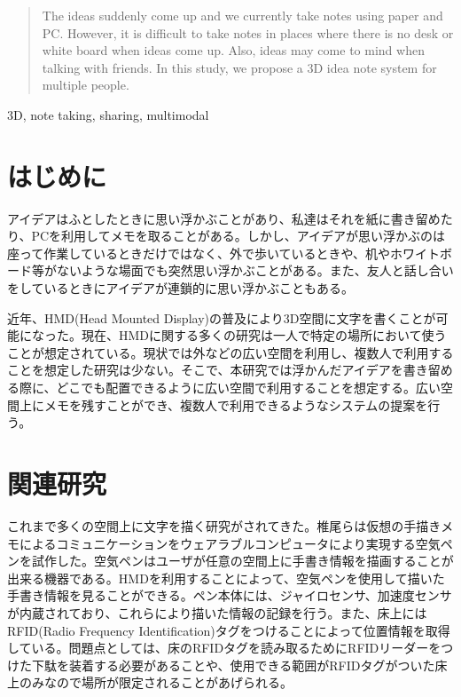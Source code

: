 \documentclass{hissymp}
\begin{document}

\begin{abstract}
The ideas suddenly come up and we currently take notes using paper and PC. However, it is difficult to take notes in places where there is no desk or white board  when ideas come up. Also, ideas may come to mind when talking with friends. In this study, we propose a 3D idea note system for multiple people.
\end{abstract}

\begin{keyword}	
3D, note taking, sharing, multimodal
\end{keyword}

\maketitle	



\section{はじめに}
アイデアはふとしたときに思い浮かぶことがあり、私達はそれを紙に書き留めたり、PCを利用してメモを取ることがある。しかし、アイデアが思い浮かぶのは座って作業しているときだけではなく、外で歩いているときや、机やホワイトボード等がないような場面でも突然思い浮かぶことがある。また、友人と話し合いをしているときにアイデアが連鎖的に思い浮かぶこともある。

近年、HMD(Head Mounted Display)の普及により3D空間に文字を書くことが可能になった。現在、HMDに関する多くの研究は一人で特定の場所において使うことが想定されている。現状では外などの広い空間を利用し、複数人で利用することを想定した研究は少ない。そこで、本研究では浮かんだアイデアを書き留める際に、どこでも配置できるように広い空間で利用することを想定する。広い空間上にメモを残すことができ、複数人で利用できるようなシステムの提案を行う。


\section{関連研究}
これまで多くの空間上に文字を描く研究がされてきた。椎尾ら\cite{tex1,tex2}は仮想の手描きメモによるコミュニケーションをウェアラブルコンピュータにより実現する空気ペンを試作した。空気ペンはユーザが任意の空間上に手書き情報を描画することが出来る機器である。HMDを利用することによって、空気ペンを使用して描いた手書き情報を見ることができる。ペン本体には、ジャイロセンサ、加速度センサが内蔵されており、これらにより描いた情報の記録を行う。また、床上にはRFID(Radio Frequency Identification)タグをつけることによって位置情報を取得している。問題点としては、床のRFIDタグを読み取るためにRFIDリーダーをつけた下駄を装着する必要があることや、使用できる範囲がRFIDタグがついた床上のみなので場所が限定されることがあげられる。
\end{document}
